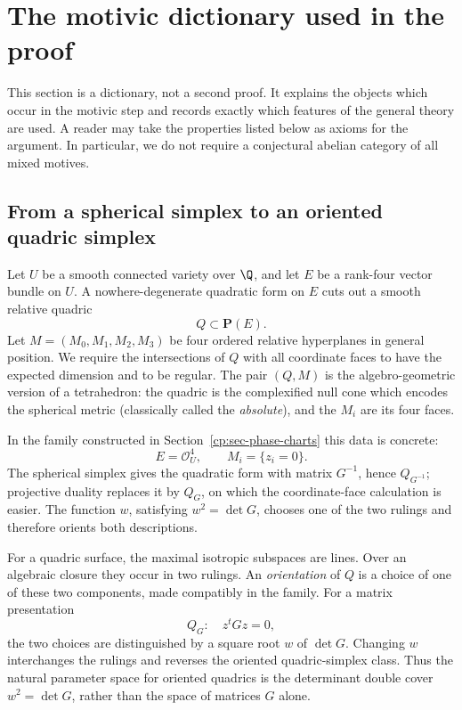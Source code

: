 \section{The motivic dictionary used in the proof}
\label{cp:sec-motivic-dictionary}

This section is a dictionary, not a second proof.  It explains the objects
which occur in the motivic step and records exactly which features of the
general theory are used.  A reader may take the properties listed below as
axioms for the argument.  In particular, we do not require a conjectural
abelian category of all mixed motives.

\subsection{From a spherical simplex to an oriented quadric simplex}
\label{cp:subsec-quadric-simplex}

Let \(U\) be a smooth connected variety over \(\Q\), and let \(E\) be a
rank-four vector bundle on \(U\).  A nowhere-degenerate quadratic form on
\(E\) cuts out a smooth relative quadric
\[
 Q\subset \mathbf P(E).
\]
Let \(M=(M_0,M_1,M_2,M_3)\) be four ordered relative hyperplanes in general
position.  We require the intersections of \(Q\) with all coordinate faces
to have the expected dimension and to be regular.  The pair \((Q,M)\) is the
algebro-geometric version of a tetrahedron: the quadric is the complexified
null cone which encodes the spherical metric (classically called the
\emph{absolute}), and the \(M_i\) are its four faces.

In the family constructed in Section~\ref{cp:sec-phase-charts} this data is
concrete:
\[
 E=\mathcal O_U^4,\qquad M_i=\{z_i=0\}.
\]
The spherical simplex gives the quadratic form with matrix \(G^{-1}\), hence
\(Q_{G^{-1}}\); projective duality replaces it by \(Q_G\), on which the
coordinate-face calculation is easier.  The function \(w\), satisfying
\(w^2=\det G\), chooses one of the two rulings and therefore orients both
descriptions.

For a quadric surface, the maximal isotropic subspaces are lines.  Over an
algebraic closure they occur in two rulings.  An \emph{orientation} of \(Q\)
is a choice of one of these two components, made compatibly in the family.
For a matrix presentation
\[
 Q_G:\quad z^tGz=0,
\]
the two choices are distinguished by a square root \(w\) of \(\det G\).
Changing \(w\) interchanges the rulings and reverses the oriented
quadric-simplex class.  Thus the natural parameter space for oriented
quadrics is the determinant double cover \(w^2=\det G\), rather than the
space of matrices \(G\) alone.

